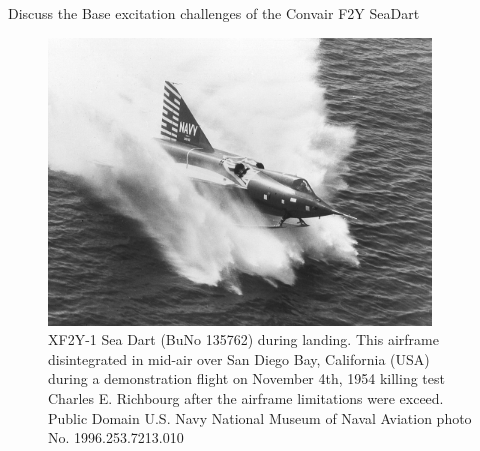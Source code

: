 \documentclass[12pt,letter]{article}
\numberwithin{ex}{section} %
\numberwithin{re}{section} %
\newtheorem{pr}{Practical Example}
\numberwithin{pr}{section} %
\newenvironment{practical_example}{\begin{mdframed}[linecolor=orange,middlelinewidth=2mm,roundcorner=20pt]\begin{pr}\normalfont}{\end{pr}\end{mdframed}}
\newcommand{\bl}[1]{\textcolor[rgb]{0.00,0.00,1.00}{#1}}
\begin{document}
		\begin{practical_example}
			Discuss the Base excitation challenges of the Convair F2Y SeaDart
			\begin{figure}[H]
				\centering
				\includegraphics[width=4in]{../figures/Convair_F2Y_SeaDart}
				\caption{XF2Y-1 Sea Dart (BuNo 135762) during landing. This airframe disintegrated in mid-air over San Diego Bay, California (USA) during a demonstration flight on November 4th, 1954 killing test Charles E. Richbourg after the airframe limitations were exceed. \bl{Public Domain 	U.S. Navy National Museum of Naval Aviation photo No. 1996.253.7213.010}}
			\end{figure}	
		\end{practical_example}
		
\end{document}
